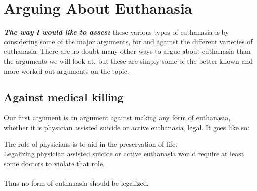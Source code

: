 \documentclass[12pt, openany]{book}
\begin{document}
\hypertarget{arguing-about-euthanasia}{%
\section{Arguing About Euthanasia}\label{arguing-about-euthanasia}}

\textbf{\emph{The way I would like to assess}} these various types of euthanasia is by considering some of the major arguments, for and against the different varieties of euthanasia. There are no doubt many other ways to argue about euthanasia than the arguments we will look at, but these are simply some of the better known and more worked-out arguments on the topic.

\hypertarget{against-medical-killing}{%
\subsection*{Against medical killing}\label{against-medical-killing}}


Our first argument is an argument against making any form of euthanasia, whether it is physician assisted suicide or active euthanasia, legal. It goes like so:

\begin{center}

\begin{argument}

The role of physicians is to aid in the preservation of life.\\
Legalizing physician assisted suicide or active euthanasia would require at least some doctors to violate that role.\\
~\\
Thus no form of euthanasia should be legalized.

\end{argument}

\end{center}
\end{document}
